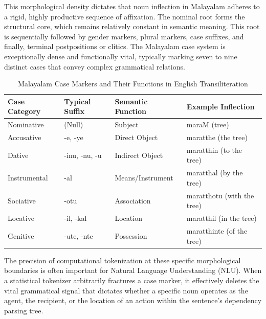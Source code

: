 \documentclass[12pt]{article}
\begin{document}
This morphological density dictates that noun inflection in Malayalam adheres to a rigid, highly productive sequence of affixation. The nominal root forms the structural core, which remains relatively constant in semantic meaning. This root is sequentially followed by gender markers, plural markers, case suffixes, and finally, terminal postpositions or clitics. The Malayalam case system is exceptionally dense and functionally vital, typically marking seven to nine distinct cases that convey complex grammatical relations.

\begin{table}[H]
\centering
\begin{tabular}{llll}
\toprule
\textbf{Case Category} & \textbf{Typical Suffix} & \textbf{Semantic Function} & \textbf{Example Inflection} \\
\midrule
Nominative   & (Null)           & Subject          & maraM (tree) \\
Accusative   & -e, -ye          & Direct Object    & maratthe (the tree) \\
Dative       & -inu, -nu, -u    & Indirect Object  & maratthin (to the tree) \\
Instrumental & -al              & Means/Instrument & maratthal (by the tree) \\
Sociative    & -otu             & Association      & maratthotu (with the tree) \\
Locative     & -il, -kal        & Location         & maratthil (in the tree) \\
Genitive     & -ute, -nte       & Possession       & maratthinte (of the tree) \\
\bottomrule
\end{tabular}
\caption{Malayalam Case Markers and Their Functions in English Transiliteration}
\label{tab:malayalam_cases}
\end{table}

The precision of computational tokenization at these specific morphological boundaries is often important for Natural Language Understanding (NLU). When a statistical tokenizer arbitrarily fractures a case marker, it effectively deletes the vital grammatical signal that dictates whether a specific noun operates as the agent, the recipient, or the location of an action within the sentence's dependency parsing tree. \cite{asudevi2019malayalam, nimal2017malayalamnounverb, asudevi2023acquisition}
\end{document}
